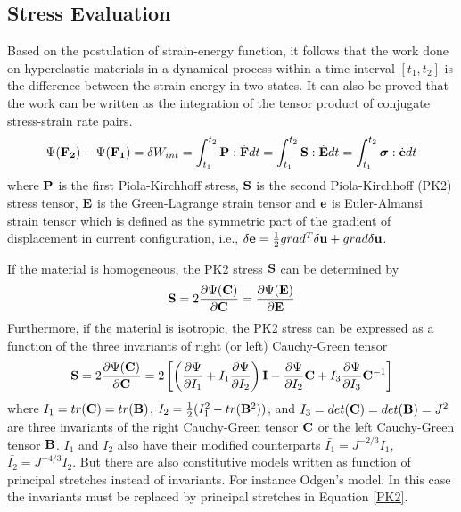 \subsection{Stress Evaluation}
Based on the postulation of strain-energy function, it follows that the work done on hyperelastic materials in a dynamical process within a time interval $[t_1, t_2]$ is the difference between the strain-energy in two states. It can also be proved that the work can be written as the integration of the tensor product of conjugate stress-strain rate pairs.
\begin{equation}
\Psi({\bold{F_2}}) - \Psi({\bold{F_1}}) = \delta{W_{int}} = \int_{t_1}^{t_2}\bold{P}:\dot{\bold{F}}dt = \int_{t_1}^{t_2}\bold{S}:\dot{\bold{E}}dt = 
\int_{t_1}^{t_2}\boldsymbol{\sigma}:\dot{\bold{e}}dt
\end{equation}
where $\bold{P}$ is the first Piola-Kirchhoff stress, $\bold{S}$ is the second Piola-Kirchhoff (PK2) stress tensor, $\bold{E}$ is the Green-Lagrange strain tensor and $\bold{e}$ is Euler-Almansi strain tensor which is defined as the symmetric part of the gradient of displacement in current configuration, i.e., $\delta\bold{e} = \frac{1}{2}{ grad^T\delta\bold{u} + grad\delta\bold{u}}$.

If the material is homogeneous, the PK2 stress $\bold{S}$ can be determined by 
\begin{equation}
\bold{S} = 2\frac{\partial\Psi(\bold{C})}{\partial{\bold{C}}} = \frac{\partial\Psi(\bold{E})}{\partial{\bold{E}}}
\end{equation}
Furthermore, if the material is isotropic, the PK2 stress can be expressed as a function of the three invariants of right (or left) Cauchy-Green tensor
\begin{equation} \label{PK2}
\bold{S} = 2\frac{\partial\Psi({\bold{C})}}{\partial{\bold{C}}} = 2\left[\left( \frac{\partial\Psi}{\partial{I_1}} + I_1 \frac{\partial\Psi}{\partial{I_2}} \right)\bold{I} -  \frac{\partial\Psi}{\partial{I_2}}\bold{C} + I_3 \frac{\partial\Psi}{\partial{I_3}}{\bold{C}}^{-1} \right]
\end{equation}
where $I_1 = tr(\bold{C}) = tr(\bold{B})$, $I_2 = \frac{1}{2}(I_1^2 - tr(\bold{B}^2))$, and $I_3 = det(\bold{C}) = det(\bold{B}) = J^2$ are three invariants of the right Cauchy-Green tensor $\bold{C}$ or the left Cauchy-Green tensor $\bold{B}$. $I_1$ and $I_2$ also have their modified counterparts $\bar{I_1} = J^{-2/3}I_1$, $\bar{I_2} = J^{-4/3}I_2$. But there are also constitutive models written as function of principal stretches instead of invariants. For instance Odgen's model. In this case the invariants must be replaced by principal stretches in Equation \ref{PK2}.

